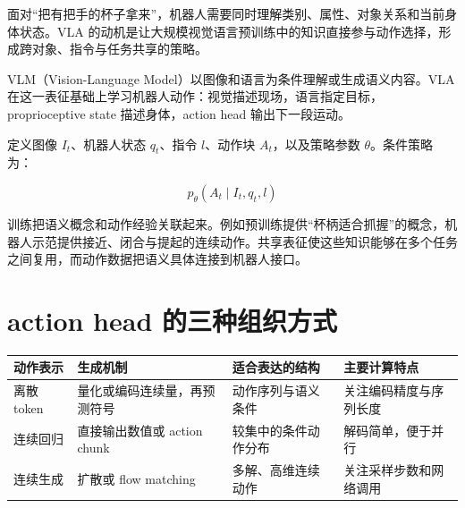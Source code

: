 \documentclass[UTF8,a4paper,11pt,oneside,openany,fontset=none]{ctexbook}
\begin{document}
面对``把有把手的杯子拿来''，机器人需要同时理解类别、属性、对象关系和当前身体状态。VLA 的动机是让大规模视觉语言预训练中的知识直接参与动作选择，形成跨对象、指令与任务共享的策略。

VLM（Vision-Language Model）以图像和语言为条件理解或生成语义内容。VLA 在这一表征基础上学习机器人动作：视觉描述现场，语言指定目标，proprioceptive state 描述身体，action head 输出下一段运动。

定义图像 \(I_{t}\)、机器人状态 \(q_{t}\)、指令 \(l\)、动作块 \(A_{t}\)，以及策略参数 \(\theta\)。条件策略为：

\[
p_\theta(A_t\mid I_t,q_t,l)
\]

训练把语义概念和动作经验关联起来。例如预训练提供``杯柄适合抓握''的概念，机器人示范提供接近、闭合与提起的连续动作。共享表征使这些知识能够在多个任务之间复用，而动作数据把语义具体连接到机器人接口。

\section{action head 的三种组织方式}\label{action-head-ux7684ux4e09ux79cdux7ec4ux7ec7ux65b9ux5f0f}

{\small %
\begin{longtable}[]{@{}
  >{\raggedright\arraybackslash}p{}
  >{\raggedright\arraybackslash}p{}
  >{\raggedright\arraybackslash}p{}
  >{\raggedright\arraybackslash}p{}@{}}
\toprule\noalign{}
\begin{minipage}[b]{\linewidth}\raggedright
动作表示
\end{minipage} & \begin{minipage}[b]{\linewidth}\raggedright
生成机制
\end{minipage} & \begin{minipage}[b]{\linewidth}\raggedright
适合表达的结构
\end{minipage} & \begin{minipage}[b]{\linewidth}\raggedright
主要计算特点
\end{minipage} \\
\midrule\noalign{}
\endhead
\bottomrule\noalign{}
\endlastfoot
离散 token & 量化或编码连续量，再预测符号 & 动作序列与语义条件 & 关注编码精度与序列长度 \\
连续回归 & 直接输出数值或 action chunk & 较集中的条件动作分布 & 解码简单，便于并行 \\
连续生成 & 扩散或 flow matching & 多解、高维连续动作 & 关注采样步数和网络调用 \\
\end{longtable}
}
\end{document}
